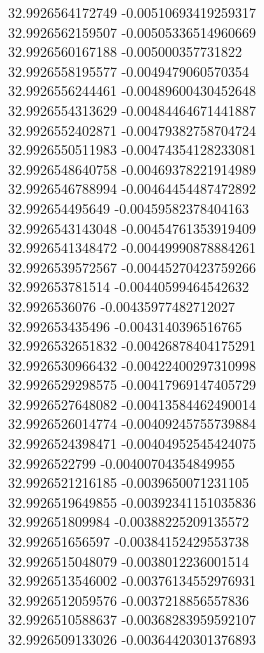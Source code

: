 {32.9926564172749	-0.00510693419259317\\
32.9926562159507	-0.00505336514960669\\
32.9926560167188	-0.005000357731822\\
32.9926558195577	-0.0049479060570354\\
32.9926556244461	-0.00489600430452648\\
32.9926554313629	-0.00484464671441887\\
32.9926552402871	-0.00479382758704724\\
32.9926550511983	-0.00474354128233081\\
32.9926548640758	-0.00469378221914989\\
32.9926546788994	-0.00464454487472892\\
32.992654495649	-0.00459582378404163\\
32.9926543143048	-0.00454761353919409\\
32.9926541348472	-0.00449990878884261\\
32.9926539572567	-0.00445270423759266\\
32.992653781514	-0.00440599464542632\\
32.9926536076	-0.00435977482712027\\
32.992653435496	-0.0043140396516765\\
32.9926532651832	-0.00426878404175291\\
32.9926530966432	-0.00422400297310998\\
32.9926529298575	-0.00417969147405729\\
32.9926527648082	-0.00413584462490014\\
32.9926526014774	-0.00409245755739884\\
32.9926524398471	-0.00404952545424075\\
32.9926522799	-0.00400704354849955\\
32.9926521216185	-0.0039650071231105\\
32.9926519649855	-0.00392341151035836\\
32.992651809984	-0.00388225209135572\\
32.992651656597	-0.00384152429553738\\
32.9926515048079	-0.0038012236001514\\
32.9926513546002	-0.00376134552976931\\
32.9926512059576	-0.0037218856557836\\
32.9926510588637	-0.00368283959592107\\
32.9926509133026	-0.00364420301376893\\
}
